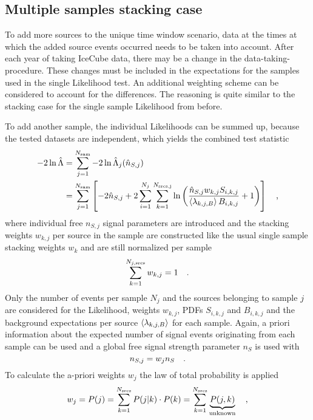 \subsection{Multiple samples stacking case}
To add more sources to the unique time window scenario, data at the times at which the added source events occurred needs to be taken into account.
After each year of taking IceCube data, there may be a change in the data-taking-procedure.
These changes must be included in the expectations for the samples used in the single Likelihood test.
An additional weighting scheme can be considered to account for the differences.
The reasoning is quite similar to the stacking case for the single sample Likelihood from before.

To add another sample, the individual Likelihoods can be summed up, because the tested datasets are independent, which yields the combined test statistic
\begin{align}
  -2\ln\hat{\Lambda}
  &= \sum_{j=1}^{N_\text{sam}} -2\ln\hat{\Lambda}_j(\hat{n}_{S,j}) \\
  &= \sum_{j=1}^{N_\text{sam}} \left[
        -2\hat{n}_{S,j} +
        2\sum_{i=1}^{N_j} \sum_{k=1}^{N_\text{srcs,j}} \ln\left(
          \frac{\hat{n}_{S,j} w_{k,j} S_{i,k,j}}
               {\Braket{\lambda_{k,j,B}} B_{i,k,j}}
          + 1
        \right)
      \right]
  \quad\text{,}
\end{align}
where individual free $n_{S,j}$ signal parameters are introduced and the stacking weights $w_{k,j}$ per source in the sample are constructed like the usual single sample stacking weights $w_k$ and are still normalized per sample
\begin{equation}
  \sum_{k=1}^{N_{j,\text{srcs}}} w_{k,j} = 1
  \quad\text{.}
\end{equation}
Only the number of events per sample $N_j$ and the sources belonging to sample $j$ are considered for the Likelihood, weights $w_{k,j}$, PDFs $S_{i,k,j}$ and $B_{i,k,j}$ and the background expectations per source $\Braket{\lambda_{k,j,B}}$ for each sample.
Again, a priori information about the expected number of signal events originating from each sample can be used and a global free signal strength parameter $n_S$ is used with
\begin{equation}
  n_{S,j} = w_j n_S
  \quad\text{.}
\end{equation}
To calculate the a-priori weights $w_j$ the law of total probability is applied 
\begin{equation}
  w_j = P(j) = \sum_{k=1}^{N_\text{srcs}} P(j|k)\cdot P(k)
  = \sum_{k=1}^{N_\text{srcs}} \underbrace{P(j,k)}_\text{unknown}
  \quad\text{,}
\end{equation}

